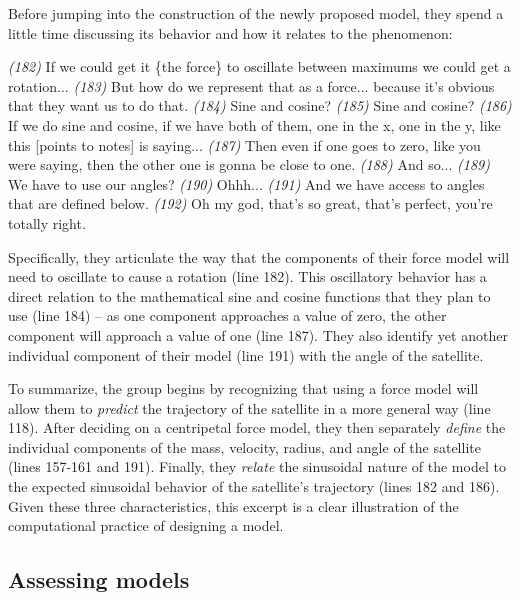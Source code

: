 \documentclass{msuphddissertation}
\begin{document}
\begin{doublespace}
Before jumping into the construction of the newly proposed model, they spend a little time discussing its behavior and how it relates to the phenomenon: \begin{description}
\SD \textit{(182)} If we could get it \{the force\} to oscillate between maximums we could get a rotation...
\SD \textit{(183)} But how do we represent that as a force... because it's obvious that they want us to do that.
\SA \textit{(184)} Sine and cosine?
\SD \textit{(185)} Sine and cosine?
\SA \textit{(186)} If we do sine and cosine, if we have both of them, one in the x, one in the y, like this [points to notes] is saying...
\SA \textit{(187)} Then even if one goes to zero, like you were saying, then the other one is gonna be close to one.
\SA \textit{(188)} And so...
\SD \textit{(189)} We have to use our angles?
\SC \textit{(190)} Ohhh...
\SD \textit{(191)} And we have access to angles {that are defined below}.
\SD \textit{(192)} Oh my god, that’s so great, that’s perfect, you're totally right.
\end{description}  Specifically, they articulate the way that the components of their force model will need to oscillate to cause a rotation (line 182).  This oscillatory behavior has a direct relation to the mathematical sine and cosine functions that they plan to use (line 184) -- as one component approaches a value of zero, the other component will approach a value of one (line 187).  They also identify yet another individual component of their model (line 191) with the angle of the satellite.

To summarize, the group begins by recognizing that using a force model will allow them to \textit{predict} the trajectory of the satellite in a more general way (line 118).  After deciding on a centripetal force model, they then separately \textit{define} the individual components of the mass, velocity, radius, and angle of the satellite (lines 157-161 and 191).  Finally, they \textit{relate} the sinusoidal nature of the model to the expected sinusoidal behavior of the satellite's trajectory (lines 182 and 186).  Given these three characteristics, this excerpt is a clear illustration of the computational practice of designing a model.

%
%
%
%
%
%
%
%
%
%
%
%
%
%
%
%

\subsection{Assessing models}\label{CH5:SecAssessingModels}


\end{doublespace}
\end{document}
